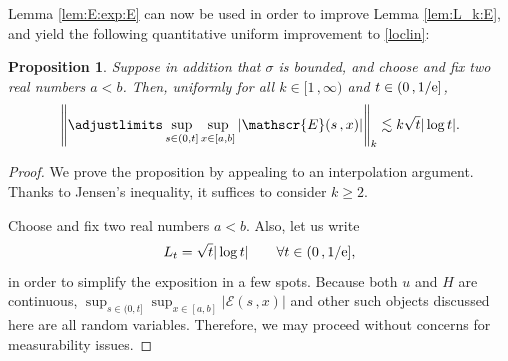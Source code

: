 \documentclass[reqno]{amsart}
\newcommand{\<}{\langle}
\renewcommand{\>}{\rangle}
\newcommand{\1}{\mathbb{1}}
\newcommand{\e}{{\rm e}}
\renewcommand{\ge}{\geqslant}
\newtheorem{proposition}[stat]{Proposition}
\theoremstyle{definition}
\numberwithin{equation}{section}
\begin{document}
Lemma \ref{lem:E:exp:E} can now be used in order to improve
Lemma \ref{lem:L_k:E}, and yield the following quantitative uniform
improvement to \eqref{loclin}:

\begin{proposition}\label{pr:L_k:supE}
	Suppose in addition that $\sigma$ is bounded,
	and choose and fix two real numbers $a<b$. Then,
	uniformly for all $k \in [1\,,\infty)$ and $t \in (0\,,1/\e]$,
	\[
		\left\| \adjustlimits\sup_{s\in(0,t]}
		\sup_{x \in [a,b]} |\mathscr{E}(s\,,x)| \right\|_k \lesssim k \sqrt{t}|\log t|.
	\]
\end{proposition}

\begin{proof}
	We prove the proposition by appealing to an
	interpolation argument. Thanks to Jensen's inequality,
	it suffices to consider $k\ge 2$.
	
	Choose and fix two real numbers
	$a<b$. Also, let us write
	\[
		L_t = \sqrt{t}|\log t|\qquad\forall t\in(0\,,1/\e],
	\]
	in order to simplify the exposition in a few spots.
	Because both $u$ and $H$ are continuous, 
	$\sup_{s\in(0,t]}\sup_{x\in[a,b]}|\mathscr{E}(s\,,x)|$
	and other such objects discussed here are all random variables. Therefore,
	we may proceed without concerns for measurability issues.
	

\end{proof}
\end{document}
